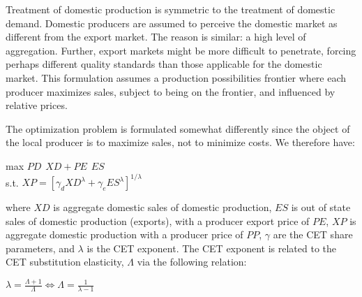 \documentclass{article}
\begin{document}
Treatment of domestic production is symmetric to the treatment of domestic demand. Domestic producers are assumed to perceive the domestic market as different from the export market. The reason is similar:  a high level of aggregation. Further, export markets might be more difficult to penetrate, forcing perhaps different quality standards than those applicable for the domestic market. This formulation assumes a production possibilities frontier where each producer maximizes sales, subject to being on the frontier, and influenced by relative prices.

The optimization problem is formulated somewhat differently since the object of the local producer is to maximize sales, not to minimize costs. We therefore have:

\begin {center}

max $PD \hspace{5pt} XD + PE \hspace{5pt} ES$\\
s.t. $XP = \left[\gamma_d XD^\lambda + \gamma_e ES^\lambda \right]^{1/\lambda}$

\end{center}

where $XD$ is aggregate domestic sales of domestic production, $ES$ is out of state sales of domestic production (exports), with a producer export price of $PE$, $XP$ is aggregate domestic production with a producer price of $PP$, $\gamma$ are the CET share parameters, and $\lambda$ is the CET exponent. The CET exponent is related to the CET substitution elasticity, $\Lambda$ via the following relation:

\begin{center}

$\lambda = \frac{\Lambda + 1}{\Lambda} \Longleftrightarrow \Lambda = \frac{1}{\lambda - 1}$

\end{center}
\end{document}
